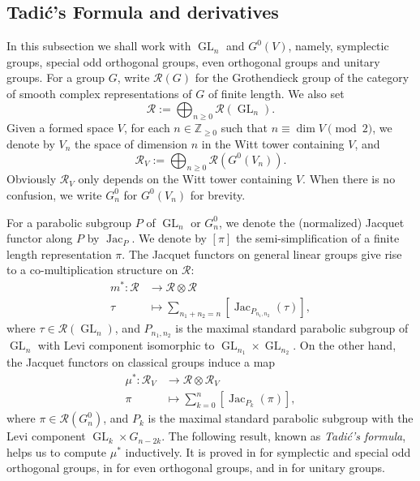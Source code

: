 \documentclass[11pt,letterpaper]{amsart}
\theoremstyle{plain}
\numberwithin{theorem}{section}
\numberwithin{equation}{subsection}
\theoremstyle{remark}
\newcommand{\GL}{\operatorname{GL}}
\newcommand{\Jac}{\operatorname{Jac}}
\newcommand{\Z}{\mathbb{Z}}
\def\calR{\mathcal{R}}
\begin{document}
\vskip 5pt

\subsection{Tadi\'c's Formula and derivatives}\label{subsec:TadicFormulaDerivative}

In this subsection we shall work with $\GL_n$ and $G^0(V)$, namely, symplectic groups, special odd orthogonal groups, even orthogonal groups and unitary groups. For a group \(G\), write \(\calR(G)\) for the Grothendieck group of the category of smooth complex representations of \(G\) of finite length. We also set
\[
    \calR:=\bigoplus_{n\geq 0}\calR\left(\GL_n\right).
\]
Given a formed space $V$, for each $n\in \Z_{\geq 0}$ such that $n\equiv \dim V \pmod2$, we denote by $V_n$ the space of dimension $n$ in the Witt tower containing $V$, and 
\[
    \calR_V:=\bigoplus_{n\geq 0}\calR\left(G^0(V_n)\right).
\]
Obviously $\calR_V$ only depends on the Witt tower containing $V$. When there is no confusion, we write $G^0_n$ for $G^0(V_n)$ for brevity.

\vskip 5pt

For a parabolic subgroup \(P\) of \(\GL_n\) or \(G^0_n\), we denote the (normalized) Jacquet functor along \(P\) by \(\Jac_{P}\). We denote by \([\pi]\) the semi-simplification of a finite length representation $\pi$. The Jacquet functors on general linear groups give rise to a co-multiplication structure on \(\calR\):
\begin{align*}
    m^*:\calR&\longrightarrow\calR\otimes\calR\\
    \tau&\longmapsto\sum_{n_1+n_2=n}\left[\Jac_{P_{n_1,n_2}}(\tau)\right],
\end{align*}
where $\tau\in\calR(\GL_n)$, and $P_{n_1,n_2}$ is the maximal standard parabolic subgroup of \(\GL_n\) with Levi component isomorphic to \(\GL_{n_1}\times\GL_{n_2}\). On the other hand, the Jacquet functors on classical groups induce a map
\begin{align*}
    \mu^*:\calR_V&\longrightarrow\calR\otimes\calR_V\\
    \pi&\longmapsto\sum^n_{k=0}\left[\Jac_{P_k}(\pi)\right],
\end{align*}
where $\pi\in \calR\left(G^0_n\right)$, and \(P_k\) is the maximal standard parabolic subgroup with the Levi component \(\GL_k\times G_{n-2k}\).
The following result, known as \emph{Tadi\'c's formula}, helps us to compute \(\mu^*\) inductively. It is proved in \cite{MR1356358} for symplectic and special odd orthogonal groups, in \cite{MR1739616} for even orthogonal groups, and in \cite{MR1896238} for unitary groups.
\end{document}
